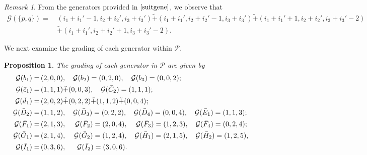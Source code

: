 \documentclass[10pt]{amsart}
\newtheorem{proposition}[theorem]{Proposition}
\theoremstyle{definition}
\theoremstyle{corollary}
\theoremstyle{remark}
\newtheorem{remark}[theorem]{Remark}
\theoremstyle{conclusion}
\begin{document}
 \begin{remark}
   From the generators provided in $\eqref{suitgene}$, we observe that  
   \begin{align}
       \mathcal{G} \left(\{p,q\}\right) = & \,    (i_1+i_1'-1,i_2+i_2',i_3+i_3') \tilde{+}(i_1+i_1',i_2+i_2'-1,i_3+i_3') \tilde{+}  (i_1+i_1'+1,i_2+i_2',i_3+i_3'-2) \nonumber \\
     & \, \tilde{+}     (i_1+i_1',i_2+i_2'+1,i_3+i_3'-2) .
   \end{align}
 \end{remark}

 We next examine the grading of each generator within $\mathcal{P}.$

\begin{proposition}
\label{grading}
   The grading of each generator in $\mathcal{P}$ are given by \begin{align}
\mathcal{G} (\bar{b}_1) = & \, (2,0,0) ,\quad \mathcal{G} (\bar{b}_2) =  (0,2,0) ,\quad\mathcal{G} (\bar{b}_3) =   (0,0,2) ;\nonumber\\
    \mathcal{G} (\bar{c}_1) = & \, (1,1,1) \tilde{+} (0,0,3) ,\quad  \mathcal{G} (\bar{C}_2) =  (1,1,1) ; \nonumber \\
    \mathcal{G} (\bar{d}_1) = & \, (2,0,2) \tilde{+} (0,2,2) \tilde{+} (1,1,2) \tilde{+} (0,0,4) ;\nonumber \\ 
    \mathcal{G}(\bar{D}_2) = & \,  (1,1,2) , \quad  \mathcal{G}(\bar{D}_3) = (0,2,2) , \quad \mathcal{G}(\bar{D}_4) = (0,0,4) ,\quad  \mathcal{G} (\bar{E}_1) =  (1,1,3) ; \nonumber \\
  \mathcal{G}(\bar{F}_1) = & \,(2,1,3) , \quad \hskip 0.1cm\mathcal{G}(\bar{F}_2) = (2,0,4) , \quad \hskip 0.07cm\mathcal{G}(\bar{F}_3) = (1,2,3), \quad \mathcal{G}(\bar{F}_4) = (0,2,4); \label{eq:generatorsgrad} \\
            \mathcal{G} (\bar{G}_1) = & \, (2,1,4), \quad \hskip 0.05cm\mathcal{G}(\bar{G}_2) = (1,2,4) , \quad \mathcal{G}(\bar{H}_1) = (2,1,5) , \quad \mathcal{G}(\bar{H}_2) = (1,2,5) , \nonumber \\
            \mathcal{G}(\bar{I}_1) = & \,  (0,3,6) , \hskip 0.2cm\quad \mathcal{G}(\bar{I}_2) = (3,0,6).\nonumber
\end{align} 
\end{proposition}
\end{document}
